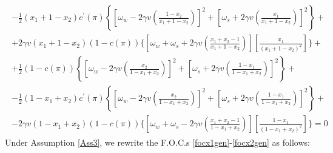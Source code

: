 \documentclass[12pt,a4paper]{article}
\begin{document}
\begin{eqnarray}
\begin{split}
        -\frac{1}{2}(x_1 + 1-x_2)c^\prime(\pi)\left\{\left[\omega_w-2\gamma v\left(\frac{1-x_2}{x_1+1-x_2}\right)\right]^2+\left[\omega_s+2\gamma v\left(\frac{x_1}{x_1+1-x_2}\right)\right]^2\right\}+ \\
        +2\gamma v(x_1 + 1-x_2)(1-c(\pi))\Bigg\{\left[\omega_w+\omega_s+2\gamma v\left(\frac{x_1+x_2-1}{x_1+1-x_2}\right)\right]\left[\frac{x_1}{(x_1+1-x_2)^2}\right]\Bigg\}+\\
        +\frac{1}{2}(1-c(\pi))\left\{\left[\omega_w-2\gamma v\left(\frac{x_2}{1-x_1+x_2}\right)\right]^2+\left[\omega_s+2\gamma v\left(\frac{1-x_1}{1-x_1+x_2}\right)\right]^2\right\}+\\
        -\frac{1}{2}(1-x_1 + x_2)c^\prime(\pi)\left\{\left[\omega_w-2\gamma v\left(\frac{x_2}{1-x_1+x_2}\right)\right]^2+\left[\omega_s+2\gamma v\left(\frac{1-x_1}{1-x_1+x_2}\right)\right]^2\right\}+\\
        -2\gamma v(1-x_1 + x_2)(1-c(\pi))\Bigg\{\left[\omega_w+\omega_s-2\gamma v\left(\frac{x_1+x_2-1}{1-x_1+x_2}\right)\right]\left[\frac{1-x_1}{(1-x_1+x_2)^2}\right]\Bigg\}=0
    \end{split}
\end{eqnarray}
Under Assumption \ref{Ass3}, we rewrite the F.O.C.s \eqref{focx1gen}-\eqref{focx2gen} as follows:
\end{document}
